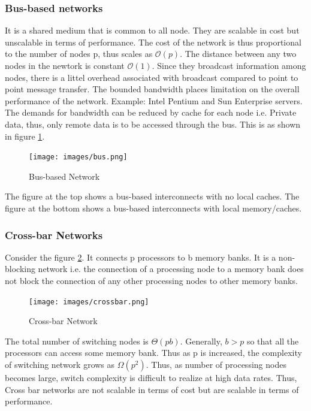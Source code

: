 \documentclass[12pt]{article}
\begin{document}
\subsubsection{Bus-based networks}
It is a shared medium that is common to all node. They are scalable in cost but unscalable in terms of performance.
The cost of the network is thus proportional to the number of nodes p, thus scales as $\mathcal{O}(p)$. The distance between any two nodes in the newtork is constant $\mathcal{O}(1)$.
Since they broadcast information among nodes, there is a littel overhead associated with broadcast compared to point to point message transfer.
The bounded bandwidth places limitation on the overall performance of the network. Example: Intel Pentium and Sun Enterprise servers. The demands for bandwidth can be reduced by cache for
each node i.e. Private data, thus, only remote data is to be accessed through the bus.
This is as shown in figure \ref{fig:bus}.
\begin{figure}[H]
    \centering
    \texttt{[image: images/bus.png]}
    \caption{Bus-based Network}
    \label{fig:bus}
\end{figure}
The figure at the top shows a bus-based interconnects with no local caches.
The figure at the bottom shows a bus-based interconnects with local memory/caches.

\subsubsection{Cross-bar Networks}
Consider the figure \ref{fig:crossbar}. It connects p processors to b memory banks.
It is a non-blocking network i.e. the connection of a processing node to a memory bank does not block the connection
of any other processing nodes to other memory banks. 
\begin{figure}[H]
    \centering
    \texttt{[image: images/crossbar.png]}
    \caption{Cross-bar Network}
    \label{fig:crossbar}
\end{figure}
The total number of switching nodes is $\Theta(pb)$. Generally, $b>p$ so that 
all the processors can access some memory bank. Thus as p is increased, the complexity of switching network 
grows as $\Omega(p^2)$. Thus, as number of processing nodes becomes large, switch complexity is difficult to realize
at high data rates. Thus, Cross bar networks are not scalable in terms of cost but are scalable in terms of performance.
\end{document}
